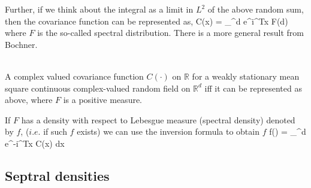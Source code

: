 Further, if we think about the integral as a limit in $L^2$ of the above random sum, then the covariance function can be represented as,
\beq C(x) = \int_{^d} e^{i\omega^Tx} F(d\omega)\eeq
where $F$ is the so-called spectral distribution. There is a more general result from Bochner.

\begin{thm}\hfill \\
	
	A complex valued covariance function $C(\cdot)$ on $\mathbb{R}$ for a weakly stationary mean square continuous complex-valued random field on $\mathbb{R}^d$ iff it can be represented as above, where $F$ is a positive measure.
\end{thm}

If $F$ has a density with respect to Lebesgue measure (spectral density) denoted by $f$, ($i.e.$ if such $f$ exists) we can use the inversion formula to obtain $f$
\beq 
f(\omega) =   \int_{^d} e^{-i\omega^Tx} C(x) dx 
\eeq

\subsection{Septral densities}


